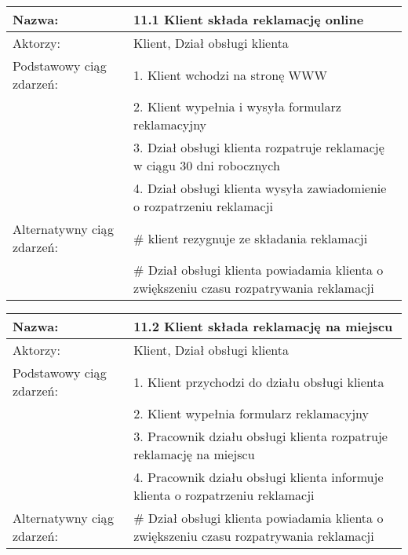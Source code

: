 \begin{center}
\vspace{1cm}

\begin{tabular}{|L{3cm}  L{13cm}|}
\hline
Nazwa: & 11.1 Klient składa reklamację online\\ \hline
Aktorzy: & Klient, Dział obsługi klienta \\ \hline
Podstawowy ciąg zdarzeń: & 1. Klient wchodzi na stronę WWW \\
 & 2. Klient wypełnia i wysyła formularz reklamacyjny \\
 & 3. Dział obsługi klienta rozpatruje reklamację w ciągu 30 dni robocznych\\
 & 4. Dział obsługi klienta wysyła zawiadomienie o rozpatrzeniu reklamacji \\
 \hline
Alternatywny ciąg zdarzeń:  & \# klient rezygnuje ze składania reklamacji \\
 & \# Dział obsługi klienta powiadamia klienta o zwiększeniu czasu rozpatrywania reklamacji \\
 \hline
\end{tabular}

\vspace{1cm}

\begin{tabular}{|L{3cm}  L{13cm}|}
\hline
Nazwa: & 11.2 Klient składa reklamację na miejscu\\ \hline
Aktorzy: & Klient, Dział obsługi klienta \\ \hline
Podstawowy ciąg zdarzeń: & 1. Klient przychodzi do działu obsługi klienta \\
 & 2. Klient wypełnia formularz reklamacyjny \\
 & 3. Pracownik działu obsługi klienta rozpatruje reklamację na miejscu \\
 & 4. Pracownik działu obsługi klienta informuje klienta o rozpatrzeniu reklamacji \\
 \hline
Alternatywny ciąg zdarzeń:  & \# Dział obsługi klienta powiadamia klienta o zwiększeniu czasu rozpatrywania reklamacji \\
 \hline
\end{tabular}

\vspace{1cm}


\end{center}
